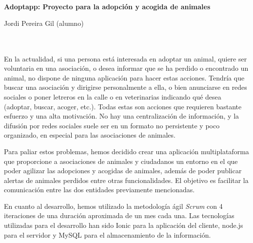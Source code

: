 \chapter*{}






\cleardoublepage
\thispagestyle{empty}

\begin{center}
{\large\bfseries Adoptapp: Proyecto para la adopción y acogida de animales}\\
\end{center}
\begin{center}
Jordi Pereira Gil (alumno)\\
\end{center}

\\

\vspace{0.7cm}
\\

En la actualidad, si una persona está interesada en adoptar un animal, quiere ser voluntaria en una asociación, o desea informar que se ha perdido o encontrado un animal, no dispone de ninguna aplicación para hacer estas acciones. Tendría que buscar una asociación y dirigirse personalmente a ella, o bien anunciarse en redes sociales o poner letreros en la calle o en veterinarias indicando qué desea (adoptar, buscar, acoger, etc.). Todas estas son acciones que requieren bastante esfuerzo y una alta motivación. No hay una centralización de información, y la difusión por redes sociales suele ser en un formato no persistente y poco organizado, en especial para las asociaciones de animales.

Para paliar estos problemas, hemos decidido crear una aplicación multiplataforma que proporcione a asociaciones de animales y ciudadanos un entorno en el que poder agilizar las adopciones y acogidas de animales, además de poder publicar alertas de animales perdidos entre otras funcionalidades. El objetivo es facilitar la comunicación entre las dos entidades previamente mencionadas.

En cuanto al desarrollo, hemos utilizado la metodología ágil \textit{Scrum} con 4 iteraciones de una duración aproximada de un mes cada una. Las tecnologías utilizadas para el desarrollo han sido Ionic para la aplicación del cliente, node.js para el servidor y MySQL para el almacenamiento de la información.

